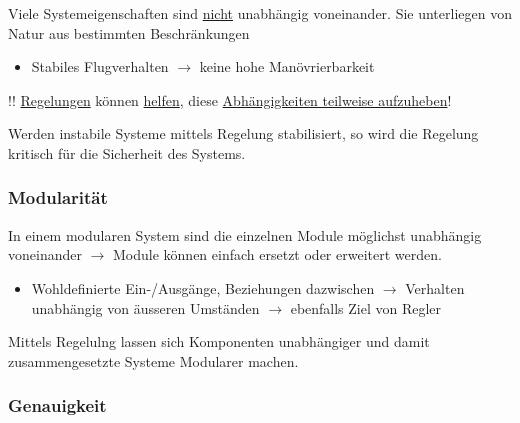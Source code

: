 \documentclass[
  10pt,
  a4paper,
]{article}
\providecommand{\tightlist}{%
  \setlength{\itemsep}{0pt}\setlength{\parskip}{0pt}}\usepackage{longtable,booktabs,array}
\numberwithin{equation}{section}
\begin{document}
\begin{multicols}{2}
\begin{tcolorbox}
Viele Systemeigenschaften sind \ul{nicht} unabhängig voneinander. Sie
unterliegen von Natur aus bestimmten Beschränkungen

\begin{itemize}
\tightlist
\item
  Stabiles Flugverhalten \(\rightarrow\) keine hohe Manövrierbarkeit
\end{itemize}

\textcolor{BurntOrange}{!!} \ul{Regelungen} können \ul{helfen}, diese
\ul{Abhängigkeiten teilweise aufzuheben}!

\end{tcolorbox}

\begin{tcolorbox}[enhanced jigsaw, coltitle=black, arc=.35mm, breakable, opacityback=0, opacitybacktitle=0.6, rightrule=.15mm, titlerule=0mm, bottomrule=.15mm, leftrule=.75mm, bottomtitle=1mm, colframe=quarto-callout-warning-color-frame, toprule=.15mm, colbacktitle=quarto-callout-warning-color!10!white, toptitle=1mm, title=\textcolor{quarto-callout-warning-color}{\faExclamationTriangle}\hspace{0.5em}{Safety Critical}, left=2mm, colback=white]

Werden instabile Systeme mittels Regelung stabilisiert, so wird die
Regelung kritisch für die Sicherheit des Systems.

\end{tcolorbox}

\hypertarget{modularituxe4t}{%
\subsubsection{Modularität}\label{modularituxe4t}}

In einem modularen System sind die einzelnen Module möglichst unabhängig
voneinander \(\rightarrow\) Module können einfach ersetzt oder erweitert
werden.

\begin{itemize}
\tightlist
\item
  Wohldefinierte Ein-/Ausgänge, Beziehungen dazwischen \(\rightarrow\)
  Verhalten unabhängig von äusseren Umständen \(\rightarrow\) ebenfalls
  Ziel von Regler
\end{itemize}

Mittels Regelulng lassen sich Komponenten unabhängiger und damit
zusammengesetzte Systeme Modularer machen.

\hypertarget{genauigkeit}{%
\subsubsection{Genauigkeit}\label{genauigkeit}}


\end{multicols}
\end{document}
